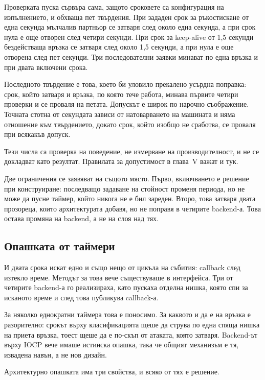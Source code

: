 Проверката пуска сървъра сама, защото сроковете са конфигурация на изпълнението, и обхваща
пет твърдения. При зададен срок за ръкостискане от една секунда мълчалив партньор се затваря
след около една секунда, а при срок нула е още отворен след четири секунди. При срок за
keep-alive от 1,5 секунди бездействаща връзка се затваря след около 1,5 секунди, а при нула е
още отворена след пет секунди. Три последователни заявки минават по една връзка и при двата
включени срока.

Последното твърдение е това, което би уловило прекалено усърдна поправка: срок, който затваря
и връзка, по която тече работа, минава първите четири проверки и се проваля на петата.
Допускът е широк по нарочно съображение. Точната стотна от секундата зависи от натоварването
на машината и няма отношение към твърдението, докато срок, който изобщо не сработва, се
проваля при всякакъв допуск.

Тези числа са проверка на поведение, не измерване на производителност, и не се докладват
като резултат. Правилата за допустимост в глава~V важат и тук.

Две ограничения се заявяват на същото място. Първо, включването е решение при
конструиране: последващо задаване на стойност променя периода, но не може да пусне таймер,
който никога не е бил зареден. Второ, това затваря двата прозореца, които архитектурата
добавя, но не поправя  в четирите backend-а. Това остава промяна на
backend, а не на слоя над тях.

\subsection{Опашката от таймери}
\label{sec:timers}

И двата срока искат едно и също нещо от цикъла на събития: callback след изтекло време.
Методът за това вече съществуваше в интерфейса. Три от четирите backend-а го реализираха,
като пускаха отделна нишка, която спи за исканото време и след това публикува callback-а.

За няколко еднократни таймера това е поносимо. За каквото и да е на връзка е разорително:
срокът върху класификацията щеше да струва по една спяща нишка на приета връзка, тоест
щеше да е по-скъп от атаката, която затваря. Backend-ът върху IOCP вече имаше истинска
опашка, така че общият механизъм е тя, извадена навън, а не нов дизайн.

Архитектурно опашката има три свойства, и всяко от тях е решение.

